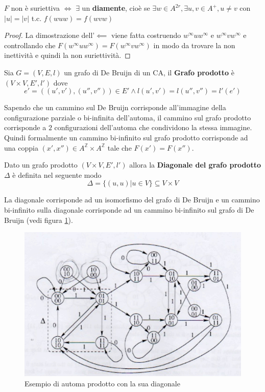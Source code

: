 \begin{teorema}
    $F$ non è suriettiva $\iff$ $\exists$ un \textbf{diamente}, cioè se
    $\exists w \in A^{2r}, \exists u,v \in A^+, u\ne v$ con $|u|=|v|$ t.c. $f(wuw)=f(wvw)$
    \begin{proof}
        La dimostrazione dell'$\impliedby$ viene fatta costruendo $w^\infty u w^\infty$
        e $w^\infty v w^\infty$ e controllando che $F(w^\infty u w^\infty) = F(w^\infty v w^\infty)$
        in modo da trovare la non inettività e quindi la non suriettività.
    \end{proof}
\end{teorema}

\begin{definizione}
    Sia $G=(V,E,l)$ un grafo di De Bruijn di un CA, il \textbf{Grafo prodotto}
    è $(V\times V,E',l')$ dove $$e'=((u',v'), (u'',v''))\in E'\land l(u',v') = l(u'',v'') = l'(e')$$
\end{definizione}

Sapendo che un cammino sul De Bruijn corrisponde all'immagine della configurazione
parziale o bi-infinita dell'automa, il cammino sul grafo prodotto corrisponde
a $2$ configurazioni dell'automa che condividono la stessa immagine. Quindi
formalmente un cammino bi-infinito sul grafo prodotto corrisponde ad una coppia
$(x',x'')\in A^\mathbb{Z} \times A^\mathbb{Z} $ tale che $F(x')=F(x'')$.

\begin{definizione}
    Dato un grafo prodotto $(V\times V,E',l')$ allora la \textbf{Diagonale del grafo prodotto}
    $\Delta$ è definita nel seguente modo
    $$\Delta = \{(u,u)| u \in V\}\subseteq V\times V$$
\end{definizione}
La diagonale corrisponde ad un isomorfismo del grafo di De Bruijn e un cammino
bi-infinito sulla diagonale corrisponde ad un cammino bi-infinito sul grafo di De
Bruijn (vedi figura \ref{fig:automa_prodotto}).

\begin{figure}[!h]
    \centering
    \includegraphics[width=.7\textwidth]{img/sistemi_complessi/automa_prodotto.png}
    \caption{Esempio di automa prodotto con la sua diagonale}
    \label{fig:automa_prodotto}
\end{figure}

